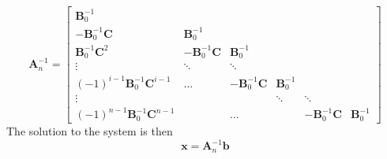 \documentclass[11pt]{article}
\begin{document}
\begin{equation}
\mathbf{A}_{n}^{-1} = \left[ \begin{array}{cccccc}\mathbf{B}_{0}^{-1} & & & & &  \\ -\mathbf{B}_{0}^{-1}\mathbf{C}  & \mathbf{B}_{0}^{-1} & & & & \\  \mathbf{B}_{0}^{-1}\mathbf{C}^2 & -\mathbf{B}_{0}^{-1}\mathbf{C}  &  \mathbf{B}_{0}^{-1} & & & \\ \vdots &  \ddots & \ddots & & & \\  (-1)^{i-1}\mathbf{B}_{0}^{-1}\mathbf{C}^{i-1} & \ldots&   -\mathbf{B}_{0}^{-1}\mathbf{C}& \mathbf{B}_0^{-1}&  & \\ \vdots &  &   & \ddots& \ddots& \\ (-1)^{n-1}\mathbf{B}_{0}^{-1}\mathbf{C}^{n-1} & & \ldots & & -\mathbf{B}_{0}^{-1}\mathbf{C}&\mathbf{B}_0^{-1} \end{array} \right] 
\end{equation} 
The solution to the system is then
\begin{equation}
\mathbf{x} = \mathbf{A}_n^{-1}\mathbf{b}
\end{equation}
\end{document}
